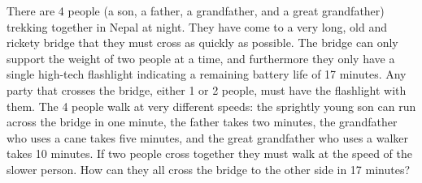 \documentclass[12pt]{article}
\newenvironment{problem}[2][Problem]{\begin{trivlist}
\item[\hskip \labelsep {\bfseries #1}\hskip \labelsep {\bfseries #2.}]}{\end{trivlist}}
\begin{document}
\begin{problem}{9}
There are 4 people (a son, a father, a grandfather, and a great grandfather) trekking together in Nepal at night. They have come to a very long, old and rickety bridge that they must cross as quickly as possible. The bridge can only support the
weight of two people at a time, and furthermore they only have a single high-tech flashlight indicating a remaining battery life of 17 minutes. Any party that crosses the bridge, either 1 or 2 people, must have the flashlight with them. The 4 people walk at very different speeds: the sprightly young son can run across the bridge in one minute, the father takes two
minutes, the grandfather who uses a cane takes five minutes, and the great grandfather who uses a walker takes 10 minutes. If two people cross together they must walk at the speed of the slower person. How can they all cross the bridge to the other side in 17 minutes?
\end{problem}
\end{document}

